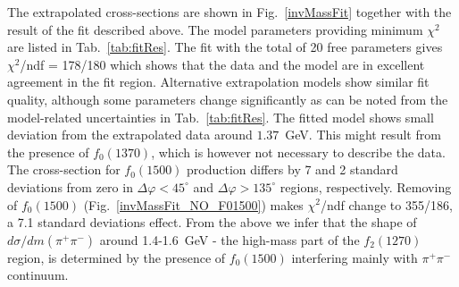 The extrapolated cross-sections are shown in Fig.~\ref{invMassFit} together with the result of the fit described above. The model parameters providing minimum $\chi^{2}$ are listed in Tab.~\ref{tab:fitRes}. The fit with the total of 20 free parameters gives $\chi^2$/ndf = 178/180 which shows that the data and the model are in excellent agreement in the fit region. Alternative extrapolation models show similar fit quality, although some parameters change significantly as can be noted from the model-related uncertainties in Tab.~\ref{tab:fitRes}.
The fitted model shows small deviation from the extrapolated data around $1.37$~GeV. This might result from the presence of $f_{0}(1370)$, which is however not necessary to describe the data. The cross-section for $f_0(1500)$ production differs by 7 and 2 standard deviations from zero in  $\Delta\varphi<45^\circ$ and $\Delta\varphi>135^\circ$ regions, respectively. Removing of $f_0(1500)$  (Fig.~\ref{invMassFit_NO_F01500}) makes $\chi^2$/ndf change to 355/186, a 7.1 standard deviations effect. From the above we infer that the shape of $d\sigma/dm(\pi^{+}\pi^{-})$ around 1.4-1.6~GeV - the high-mass part of the $f_{2}(1270)$ region, is determined by the presence of $f_0(1500)$ interfering mainly with $\pi^{+}\pi^{-}$ continuum.

